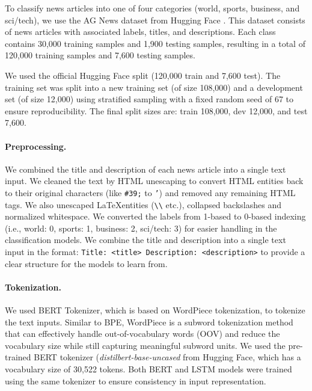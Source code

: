 To classify news articles into one of four categories (world, sports, business, and sci/tech), we use the AG News dataset from Hugging Face \cite{zhang2015character}. This dataset consists of news articles with associated labels, titles, and descriptions. Each class contains 30,000 training samples and 1,900 testing samples, resulting in a total of 120,000 training samples and 7,600 testing samples.

We used the official Hugging Face split (120,000 train and 7,600 test). The training set was split into a new training set (of size 108,000) and a development set (of size 12,000) using stratified sampling with a fixed random seed of 67 to ensure reproducibility. The final split sizes are: train 108,000, dev 12,000, and test 7,600.

\paragraph{Preprocessing.} We combined the title and description of each news article into a single text input. We cleaned the text by HTML unescaping to convert HTML entities back to their original characters (like \texttt{\#39;} to \texttt{'}) and removed any remaining HTML tags. We also unescaped \LaTeX entities (\verb|\\| etc.), collapsed backslashes and normalized whitespace. We converted the labels from 1-based to 0-based indexing (i.e., world: 0, sports: 1, business: 2, sci/tech: 3) for easier handling in the classification models. We combine the title and description into a single text input in the format: \texttt{Title: <title> Description: <description>} to provide a clear structure for the models to learn from.

\paragraph{Tokenization.} We used BERT Tokenizer, which is based on WordPiece tokenization, to tokenize the text inputs. Similar to BPE, WordPiece is a subword tokenization method that can effectively handle out-of-vocabulary words (OOV) and reduce the vocabulary size while still capturing meaningful subword units. We used the pre-trained BERT tokenizer (\textit{distilbert-base-uncased} from Hugging Face, which has a vocabulary size of 30,522 tokens. Both BERT and LSTM models were trained using the same tokenizer to ensure consistency in input representation.